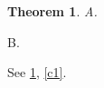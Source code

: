 \documentclass{article}
\newtheorem{theorem}{Theorem}
\begin{document}
\begin{theorem}\label{t1} A. \end{theorem}
\begin{cor}\label{c1} B. \end{cor}
See \ref{t1}, \ref{c1}.
\end{document}

